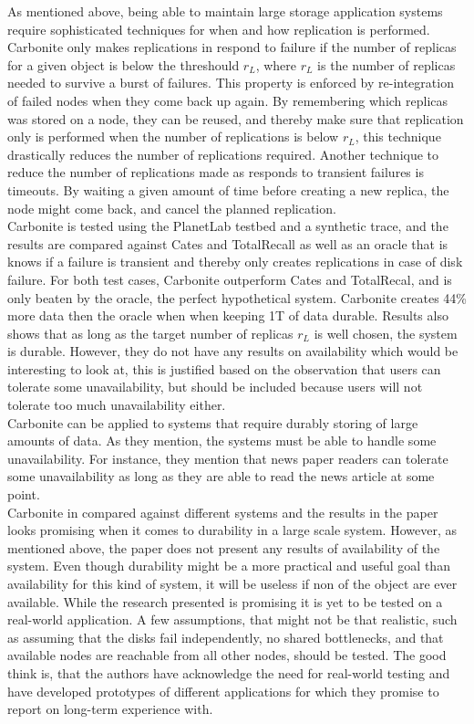 \documentclass{article}
\begin{document}
\noindent As mentioned above, being able to maintain large storage application systems require sophisticated techniques for when and how replication is performed. Carbonite only makes replications in respond to failure if the number of replicas for a given object is below the threshould $r_L$, where $r_L$ is the number of replicas needed to survive a burst of failures. This property is enforced by re-integration of failed nodes when they come back up again. By remembering which replicas was stored on a node, they can be reused, and thereby make sure that replication only is performed when the number of replications is below $r_L$, this technique drastically reduces the number of replications required. Another technique to reduce the number of replications made as responds to transient failures is timeouts. By waiting a given amount of time before creating a new replica, the node might come back, and cancel the planned replication.\\

\noindent Carbonite is tested using the PlanetLab testbed and a synthetic trace, and the results are compared against Cates and TotalRecall as well as an oracle that is knows if a failure is transient and thereby only creates replications in case of disk failure. For both test cases, Carbonite outperform Cates and TotalRecal, and is only beaten by the oracle, the perfect hypothetical system. Carbonite creates 44\% more data then the oracle when when keeping 1T of data durable. Results also shows that as long as the target number of replicas $r_L$ is well chosen, the system is durable. However, they do not have any results on availability which would be interesting to look at, this is justified based on the observation that users can tolerate some unavailability, but should be included because users will not tolerate too much unavailability either.\\

\noindent Carbonite can be applied to systems that require durably storing of large amounts of data. As they mention, the systems must be able to handle some unavailability. For instance, they mention that news paper readers can tolerate some unavailability as long as they are able to read the news article at some point.\\

\noindent Carbonite in compared against different systems and the results in the paper looks promising when it comes to durability in a large scale system. However, as mentioned above, the paper does not present any results of availability of the system. Even though durability might be a more practical and useful goal than availability for this kind of system, it will be useless if non of the object are ever available. While the research presented is promising it is yet to be tested on a real-world application. A few assumptions, that might not be that realistic, such as assuming that the disks fail independently, no shared bottlenecks, and that available nodes are reachable from all other nodes, should be tested. The good think is, that the authors have acknowledge the need for real-world testing and have developed prototypes of different applications for which they promise to report on long-term experience with.  \\
\end{document}
